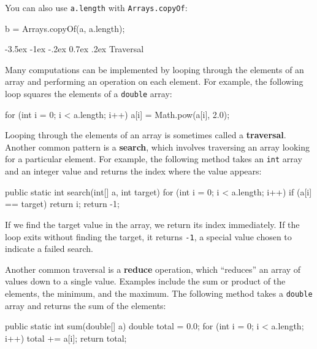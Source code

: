 \documentclass[12pt]{book}
\makeatletter
\theoremstyle{exercise}
\newcommand{\java}[1]{\verb"#1"}
\renewcommand{\section}{\@startsection{section}{1}{\z@}%
    {-3.5ex \@plus -1ex \@minus -.2ex}%
    {0.7ex \@plus.2ex}%
    {\normalfont\Large\bfseries}}
\newcommand{\java}[1]{\lstinline{#1}} %
\makeatother
\begin{document}
You can also use \java{a.length} with \java{Arrays.copyOf}:

\begin{code}
    b = Arrays.copyOf(a, a.length);
\end{code}


\section{Traversal}
\label{traversal}

Many computations can be implemented by looping through the elements of an array and performing an operation on each element.
For example, the following loop squares the elements of a \java{double} array:

\begin{code}
    for (int i = 0; i < a.length; i++) {
        a[i] = Math.pow(a[i], 2.0);
    }
\end{code}

Looping through the elements of an array is sometimes called a {\bf traversal}.
Another common pattern is a {\bf search}, which involves traversing an array looking for a particular element.
For example, the following method takes an \java{int} array and an integer value and returns the index where the value appears:


\begin{code}
public static int search(int[] a, int target) {
    for (int i = 0; i < a.length; i++) {
        if (a[i] == target) {
            return i;
        }
    }
    return -1;
}
\end{code}

If we find the target value in the array, we return its index immediately.
If the loop exits without finding the target, it returns \java{-1}, a special value chosen to indicate a failed search.


Another common traversal is a {\bf reduce} operation, which ``reduces'' an array of values down to a single value.
Examples include the sum or product of the elements, the minimum, and the maximum.
The following method takes a \java{double} array and returns the sum of the elements:

\begin{code}
public static int sum(double[] a) {
    double total = 0.0;
    for (int i = 0; i < a.length; i++) {
        total += a[i];
    }
    return total;
}
\end{code}
\end{document}
